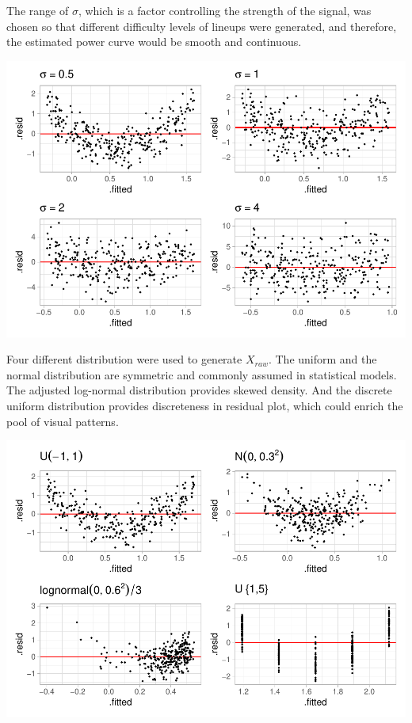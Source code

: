 \documentclass[]{interact}
\theoremstyle{plain}%
\theoremstyle{definition}
\theoremstyle{remark}
\begin{document}
The range of \(\sigma\), which is a factor controlling the strength of
the signal, was chosen so that different difficulty levels of lineups
were generated, and therefore, the estimated power curve would be smooth
and continuous.

\includegraphics{paper_comparison_files/figure-latex/different-sigma-1.pdf}

Four different distribution were used to generate \(X_{raw}\). The
uniform and the normal distribution are symmetric and commonly assumed
in statistical models. The adjusted log-normal distribution provides
skewed density. And the discrete uniform distribution provides
discreteness in residual plot, which could enrich the pool of visual
patterns.

\includegraphics{paper_comparison_files/figure-latex/different-dist-1.pdf}
\end{document}
